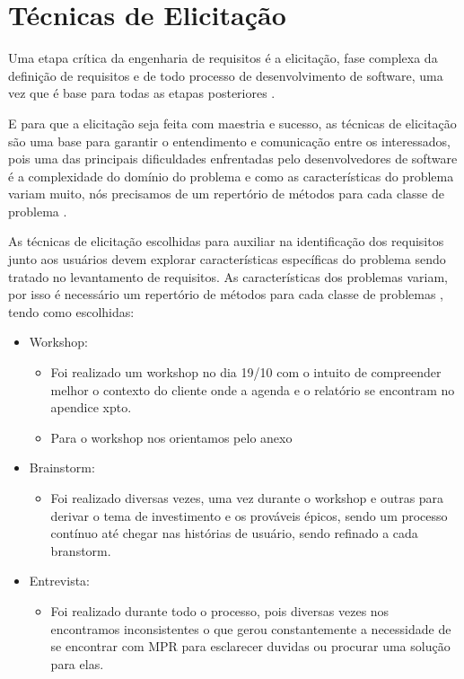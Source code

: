 \chapter[Técnicas de Elicitação]{Técnicas de Elicitação}

Uma etapa crítica da engenharia de requisitos é a elicitação, fase complexa da definição de requisitos e de todo processo de desenvolvimento de software, uma vez que é base para todas as etapas posteriores \cite{BELGAMO}.
	
E para que a elicitação seja feita com maestria e sucesso, as técnicas de elicitação são uma base para garantir o entendimento e comunicação entre os interessados, pois  uma das principais dificuldades enfrentadas pelo desenvolvedores de software é a complexidade do domínio do problema \cite{BOOCH} e como as características do problema variam muito, nós precisamos de um repertório de métodos para cada classe de problema \cite{SIDDIQI}. 

As técnicas de elicitação escolhidas para auxiliar na identificação dos requisitos junto aos usuários devem explorar características específicas do problema sendo tratado no levantamento de requisitos. As características dos problemas variam, por isso é necessário um repertório de métodos para cada classe de problemas \cite{BELGAMO}, tendo como escolhidas:

\begin{itemize}
	\item Workshop:
		\begin{itemize}
			\item Foi realizado um workshop no dia 19/10 com o intuito de compreender melhor o contexto do cliente onde a agenda e o relatório se encontram no apendice xpto.
			\item Para o workshop nos orientamos pelo anexo %
		\end{itemize}

	\item Brainstorm:
		\begin{itemize}
			\item Foi realizado diversas vezes, uma vez durante o workshop e outras para derivar o tema de investimento e os prováveis épicos, sendo um processo contínuo até chegar nas histórias de usuário, sendo refinado a cada branstorm.
		\end{itemize}

	\item Entrevista:
		\begin{itemize}
			\item Foi realizado durante todo o processo, pois diversas vezes nos encontramos inconsistentes o que gerou constantemente a necessidade de se encontrar com MPR para esclarecer duvidas ou procurar uma solução para elas.
		\end{itemize}
\end{itemize}

